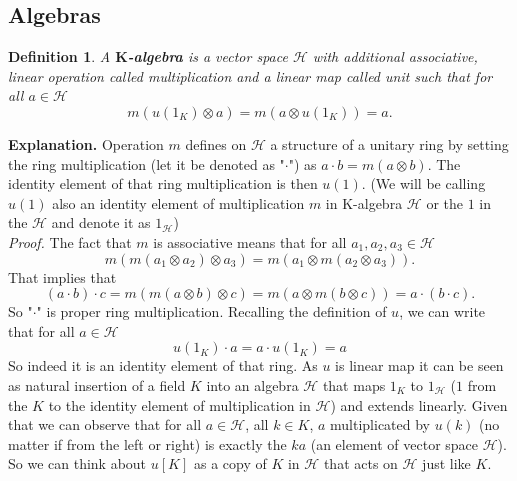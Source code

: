 \documentclass[a4paper, 12pt]{article}
\newtheorem{definition}{Definition}
\begin{document}
\subsection{Algebras}
\begin{definition}
A \textbf{$\textbf{K}$-algebra} is a vector space $\mathcal{H}$ with additional
associative, linear operation
 called multiplication and a linear map
 called unit such that for all $a \in \mathcal{H}$
\begin{equation*}
m(u(1_K) \otimes a) = m(a \otimes u(1_K)) = a.
\end{equation*}
\end{definition}
\textbf{Explanation. } Operation $m$ defines on $\mathcal{H}$ a structure of a unitary ring by setting the
ring multiplication (let it be denoted as "$\cdot$") as $a \cdot b = m(a \otimes b)$. The identity element
of that ring multiplication is then $u(1)$. (We will be calling $u(1)$ also an identity element of
multiplication $m$ in K-algebra $\mathcal{H}$ or the $1$ in the $\mathcal{H}$ and
denote it as $1_\mathcal{H}$)\\
\textit{Proof.} The fact that $m$ is associative means that for all $a_1, a_2, a_3 \in \mathcal{H}$
\begin{equation*}
m(m(a_1 \otimes a_2) \otimes a_3) = m(a_1 \otimes m(a_2 \otimes a_3)).
\end{equation*}
That implies that
\begin{equation*}
(a\cdot b) \cdot c = m(m(a \otimes b) \otimes c) = m(a \otimes m(b \otimes c)) = a \cdot (b \cdot c).
\end{equation*}
So "$\cdot$" is proper ring multiplication. Recalling the definition of $u$, we can write that for all
$a \in \mathcal{H}$
\begin{equation*}
u(1_K) \cdot a = a \cdot u(1_K) = a
\end{equation*}
So indeed it is an identity
element of that ring. As $u$ is linear map it can be seen as natural insertion of a field $K$ into an
algebra $\mathcal{H}$ that maps $1_K$ to $1_\mathcal{H}$ ($1$ from the $K$ to the identity element of
multiplication in $\mathcal{H}$) and extends linearly. Given that we can observe
that for all $a \in \mathcal{H}$, all $k \in K$, $a$ multiplicated by $u(k)$ (no matter if from the left
or right) is exactly the $ka$ (an element of vector space $\mathcal{H}$).
So we can think about $u[K]$ as a copy of $K$ in $\mathcal{H}$ that acts on $\mathcal{H}$ just like $K$.\\
\end{document}
